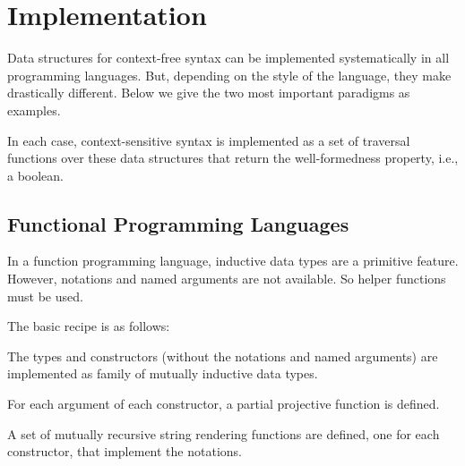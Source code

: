 \section{Implementation}

Data structures for context-free syntax can be implemented systematically in all programming languages.
But, depending on the style of the language, they make drastically different.
Below we give the two most important paradigms as examples.

In each case, context-sensitive syntax is implemented as a set of traversal functions over these data structures that return the well-formedness property, i.e., a boolean.

\subsection{Functional Programming Languages}

In a function programming language, inductive data types are a primitive feature.
However, notations and named arguments are not available.
So helper functions must be used.

The basic recipe is as follows:
\begin{compactitem}
\item The types and constructors (without the notations and named arguments) are implemented as family of mutually inductive data types.
\item For each argument of each constructor, a partial projective function is defined.
\item A set of mutually recursive string rendering functions are defined, one for each constructor, that implement the notations.
\end{compactitem}

